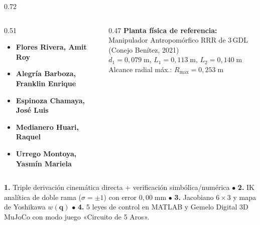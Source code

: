 \documentclass[aspectratio=169,10pt,xcolor=table]{beamer}
\begin{document}
{\begin{frame}[plain]
\begin{columns}[T,totalwidth=\textwidth]
\begin{column}{0.72\textwidth}
    \begin{cajadef}
      \fontsize{6.4}{7.6}\selectfont
      \begin{columns}[T,totalwidth=\linewidth]
        \begin{column}{0.51\linewidth}
          \begin{itemize}\setlength{\itemsep}{0pt}\setlength{\parskip}{0pt}
            \item \textbf{Flores Rivera, Amit Roy}
            \item \textbf{Alegría Barboza, Franklin Enrique}
            \item \textbf{Espinoza Chamaya, José Luis}
            \item \textbf{Medianero Huari, Raquel}
            \item \textbf{Urrego Montoya, Yasmín Mariela}
          \end{itemize}
        \end{column}
        \begin{column}{0.47\linewidth}
          \textbf{\color{uniAzul}Planta física de referencia:}\\
          Manipulador Antropomórfico RRR de 3\,GDL (Conejo Benítez, 2021)\\
          $d_1=0{,}079\;\text{m}$, $L_1=0{,}113\;\text{m}$, $L_2=0{,}140\;\text{m}$\\
          Alcance radial máx.: $R_{\max}=0{,}253\;\text{m}$
        \end{column}
      \end{columns}
    \end{cajadef}

    \vspace{0.3mm}
    \begin{cajaidea}
      \fontsize{6.1}{7.2}\selectfont
      \textbf{1.} Triple derivación cinemática directa + verificación simbólica/numérica $\bullet$ \textbf{2.} IK analítica de doble rama ($\sigma=\pm 1$) con error $0{,}00\;\text{mm}$ $\bullet$ \textbf{3.} Jacobiano $6\times 3$ y mapa de Yoshikawa $w(\bm{q})$ $\bullet$ \textbf{4.} 5 leyes de control en MATLAB y Gemelo Digital 3D MuJoCo con modo juego «Circuito de 5 Aros».
    \end{cajaidea}
  \end{column}
\end{columns}

\end{frame}
}
\end{document}
